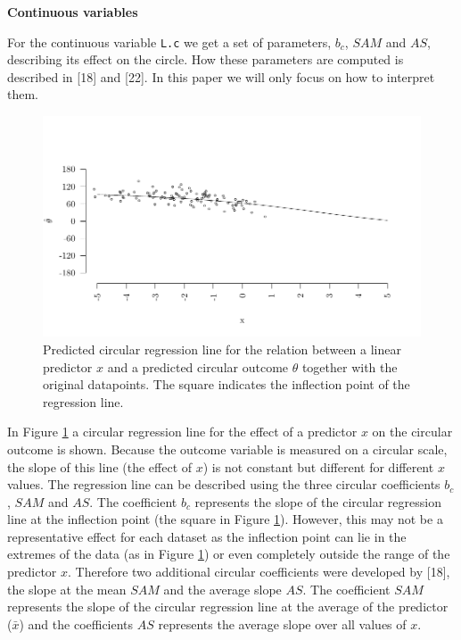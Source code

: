 \documentclass[11pt,]{article}
\begin{document}
\textbf{Continuous variables}

For the continuous variable \verb|L.c| we get a set of parameters,
\(b_c\), \(SAM\) and \(AS\), describing its effect on the circle. How
these parameters are computed is described in {[}18{]} and {[}22{]}. In
this paper we will only focus on how to interpret them.

\begin{figure}
\includegraphics{circregline.pdf}
\caption{Predicted circular regression line for the relation between a linear predictor $x$ and a predicted circular outcome $\theta$ together with the original datapoints. The square indicates the inflection point of the regression line.} 
\label{circregline}
\end{figure}

In Figure \ref{circregline} a circular regression line for the effect of
a predictor \(x\) on the circular outcome is shown. Because the outcome
variable is measured on a circular scale, the slope of this line (the
effect of \(x\)) is not constant but different for different \(x\)
values. The regression line can be described using the three circular
coefficients \(b_c\), \(SAM\) and \(AS\). The coefficient \(b_c\)
represents the slope of the circular regression line at the inflection
point (the square in Figure \ref{circregline}). However, this may not be
a representative effect for each dataset as the inflection point can lie
in the extremes of the data (as in Figure \ref{circregline}) or even
completely outside the range of the predictor \(x\). Therefore two
additional circular coefficients were developed by {[}18{]}, the slope
at the mean \(SAM\) and the average slope \(AS\). The coefficient
\(SAM\) represents the slope of the circular regression line at the
average of the predictor (\(\bar{x}\)) and the coefficients \(AS\)
represents the average slope over all values of \(x\).
\end{document}
